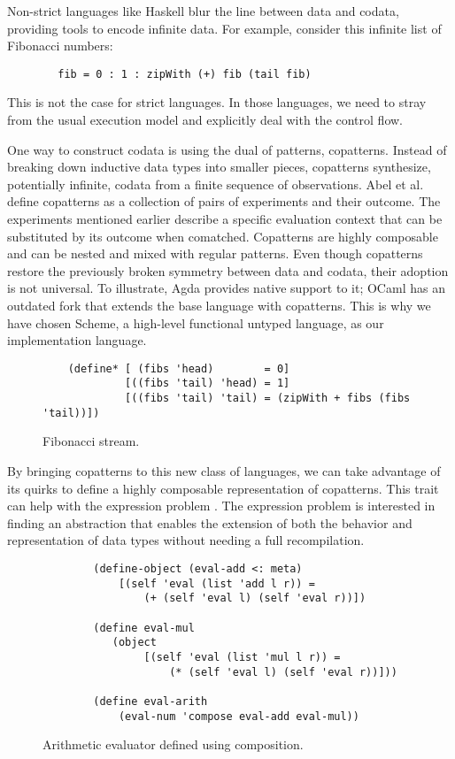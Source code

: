 Non-strict languages like Haskell blur the line between data and codata, providing tools to encode infinite data.
For example, consider this infinite list of Fibonacci numbers:
    \begin{verbatim}
        fib = 0 : 1 : zipWith (+) fib (tail fib)
    \end{verbatim}
This is not the case for strict languages. In those languages, we need to stray from the usual execution model and explicitly deal with the control flow.

One way to construct codata is using the dual of patterns, copatterns.
Instead of breaking down inductive data types into smaller pieces, copatterns synthesize, potentially infinite, codata from a finite sequence of observations.
Abel et al. \cite{APTS2013C} define copatterns as a collection of pairs of experiments and their outcome.
The experiments mentioned earlier describe a specific evaluation context that can be substituted by its outcome when comatched.
Copatterns are highly composable and can be nested and mixed with regular patterns.
Even though copatterns restore the previously broken symmetry between data and codata, their adoption is not universal.
To illustrate, Agda provides native support to it; OCaml has an outdated fork that extends the base language with copatterns.
This is why we have chosen Scheme, a high-level functional untyped language, as our implementation language.

\begin{figure}
    \begin{verbatim}
    (define* [ (fibs 'head)        = 0]
             [((fibs 'tail) 'head) = 1]
             [((fibs 'tail) 'tail) = (zipWith + fibs (fibs 'tail))])
    \end{verbatim}
    \caption{Fibonacci stream.}
    \label{fig:ex-fib}
\end{figure}

By bringing copatterns to this new class of languages, we can take advantage of its quirks to define a highly composable representation of copatterns.
This trait can help with the expression problem \cite{ExpressionProblem}.
The expression problem is interested in finding an abstraction that enables the extension of both the behavior and representation of data types without needing a full recompilation.
\begin{figure}
    \begin{verbatim}
        (define-object (eval-add <: meta)
            [(self 'eval (list 'add l r)) =
                (+ (self 'eval l) (self 'eval r))])

        (define eval-mul
           (object
                [(self 'eval (list 'mul l r)) =
                    (* (self 'eval l) (self 'eval r))]))
      
        (define eval-arith
            (eval-num 'compose eval-add eval-mul))
    \end{verbatim}
    \caption{Arithmetic evaluator defined using composition.}
    \label{fig:ex-arith-eval}
\end{figure}

